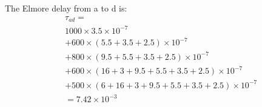 \documentclass[12pt]{article}
\begin{document}
    The Elmore delay from a to d is:
    \[
        \begin{split}
            & \tau_{ad}= \\
            & 1000\times 3.5\times 10^{-7} \\ 
            & + 600\times (5.5+3.5+2.5)\times 10^{-7} \\
            & + 800 \times (9.5+5.5+3.5+2.5)\times 10^{-7} \\
            & + 600 \times (16+3+9.5+5.5+3.5+2.5)\times 10^{-7} \\
            & + 500 \times (6+16+3+9.5+5.5+3.5+2.5)\times 10^{-7} \\
            & = 7.42 \times 10^{-3}
        \end{split}
    \]
\end{document}
